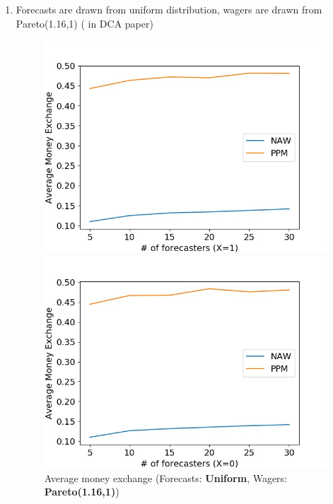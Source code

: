 \documentclass[english,10pt]{article}
\begin{document}
\begin{enumerate}
	\item Forecasts are drawn from uniform distribution, wagers are drawn from Pareto(1.16,1) ( in DCA paper)
	\begin{figure}[H]
        	\centering
        	\begin{minipage}{0.48\textwidth}
        	\includegraphics[width = \textwidth]{(UnifF_Pareto(1dot16_1)W)Avg_MnEx(X=1).jpg}
        	\end{minipage}
        	\begin{minipage}{0.48\textwidth}
        	\includegraphics[width = \textwidth]{(UnifF_Pareto(1dot16_1)W)Avg_MnEx(X=0).jpg}
        	\end{minipage}
        	\caption{Average money exchange (Forecasts: \textbf{Uniform}, Wagers: \textbf{Pareto(1.16,1)})}
        	\end{figure}
	

\end{enumerate}
\end{document}
